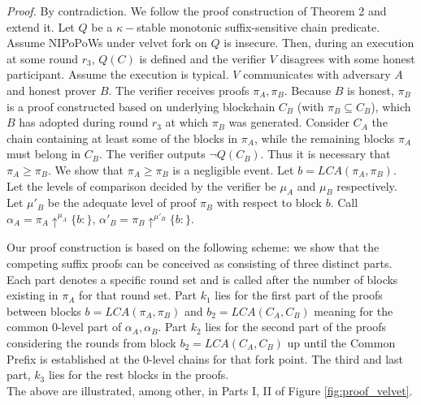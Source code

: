 \textit{Proof.} By contradiction. We follow the proof construction of Theorem 2
and extend it. Let $Q$ be a $\kappa-$stable monotonic suffix-sensitive chain
predicate. Assume NIPoPoWs under velvet fork on $Q$ is insecure. Then, during
an execution at some round  $r_3$, $Q(C)$ is defined and the verifier $V$
disagrees with some honest participant. Assume the execution is typical. $V$
communicates with adversary $A$ and honest prover $B$. The verifier receives
proofs $\pi_A, \pi_B$. Because $B$ is honest, $\pi_B$ is a proof constructed
based on underlying blockchain $C_B$ (with $\pi_B \subseteq C_B$), which $B$
has adopted during round $r_3$ at which $\pi_B$ was generated. Consider $C_A$
the chain containing at least some of the blocks in $\pi_A$, while the remaining
blocks $\pi_A$ must belong in $C_B$.
The verifier outputs $\neg Q(C_B)$. Thus it is necessary that $\pi_A \geq \pi_B$.
We show that $\pi_A \geq \pi_B$ is a negligible event.
Let $b = LCA(\pi_A, \pi_B)$. Let the levels of comparison decided by the verifier
be $\mu_A$ and $\mu_B$ respectively. Let $\mu'_B$ be the adequate level of proof
$\pi_B$  with respect to block $b$. Call $\alpha_A = \pi_A \uparrow^{\mu_A}\{b:\}$,
$\alpha'_B = \pi_B \uparrow^{\mu'_B}\{b:\}$.

Our proof construction is based on the following scheme: we show that the competing
suffix proofs can be conceived as consisting of three distinct parts. Each part
denotes a specific round set and is called after the number of blocks existing
in $\pi_A$ for that round set. Part $k_1$ lies for the first part of the proofs
between blocks $b = LCA(\pi_A, \pi_B)$ and $b_2 = LCA(C_A, C_B)$ meaning for the
common 0-level part of $\alpha_A,  \alpha_B$. Part $k_2$ lies for the second part
of the proofs considering the rounds from block $b_2 = LCA(C_A, C_B)$ up until
the Common Prefix is established at the 0-level chains for that fork point.
The third and last part, $k_3$ lies for the rest blocks in the proofs.\\
The above are illustrated, among other, in Parts I, II of Figure \ref{fig:proof_velvet}.

